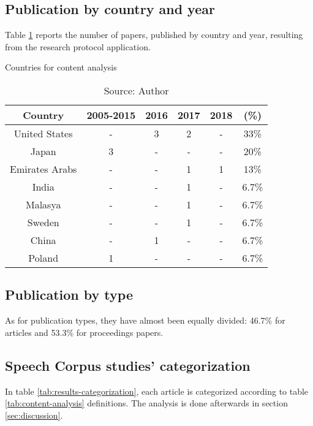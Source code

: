 \subsection{Publication by country and year}

Table \ref{tab:country-analysis} reports the number of papers, published by country and year, resulting from the research protocol application.

\begin{table}[ht]
    \centering
    \caption{Countries for content analysis}
    \begin{tabular}{|c|c|c|c|c|c|}
        \hline Country & 2005-2015 & 2016 & 2017 & 2018 & (\%) \\ \hline
        United States & - & 3 & 2 & - & 33\% \\ \hline 
        Japan & 3 & - & - & - & 20\% \\ \hline
        Emirates Arabs & - & - & 1 & 1 & 13\% \\ \hline
        India & - & - & 1 & - & 6.7\% \\ \hline
        Malasya & - & - & 1 & - & 6.7\% \\ \hline
        Sweden & - & - & 1 & - & 6.7\% \\ \hline
        China & - & 1 & - & - & 6.7\% \\ \hline
        Poland & 1 & - & - & - & 6.7\% \\ \hline
    \end{tabular}
    \caption*{Source: Author}
    \label{tab:country-analysis}
\end{table}

\subsection{Publication by type}

As for publication types, they have almost been equally divided: 46.7\% for articles and 53.3\% for proceedings papers.

\subsection{Speech Corpus studies' categorization}

In table \ref{tab:results-categorization}, each article is categorized according to table \ref{tab:content-analysis} definitions. The analysis is done afterwards in section \ref{sec:discussion}.

